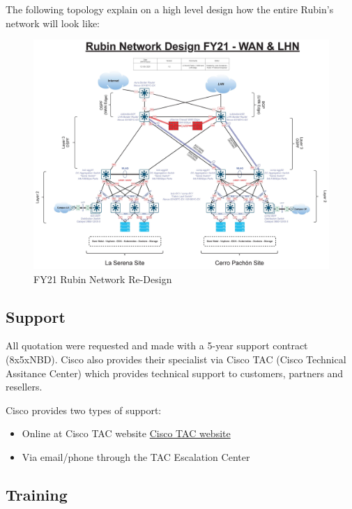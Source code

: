   The following topology explain on a high level design how the entire Rubin's network will look like:

  \begin{figure}
    \includegraphics[width=15cm]{images/fy21-rubin-network.jpg}
    \centering
    \caption{FY21 Rubin Network Re-Design}
  \end{figure}

\newpage

  \subsection{Support}

  All quotation were requested and made with a 5-year support contract (8x5xNBD). Cisco also provides their specialist via Cisco TAC (Cisco Technical Assitance Center) which provides technical support to customers, partners and resellers.

  Cisco provides two types of support:

  \begin{itemize}
    \item Online at Cisco TAC website \href{http://www.cisco.com/tac}{Cisco TAC website}
    \item Via email/phone through the TAC Escalation Center
  \end{itemize}

  \subsection{Training}

